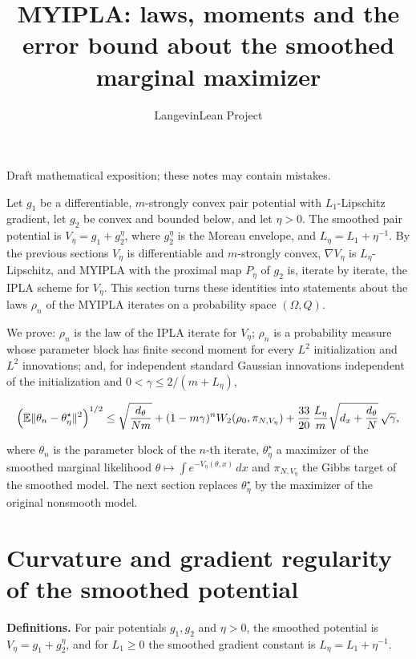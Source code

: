\documentclass[11pt,a4paper]{article}
\title{\texorpdfstring{MYIPLA: laws, moments and the error bound about the smoothed marginal maximizer}{MYIPLA: laws, moments and the error bound about the smoothed marginal maximizer}}
\author{LangevinLean Project}
\date{}
\begin{document}
\maketitle
Draft mathematical exposition; these notes may contain mistakes.


Let \(g_1\) be a differentiable, \(m\)-strongly convex pair potential with \(L_1\)-Lipschitz gradient, let \(g_2\) be convex and bounded below, and let \(\eta>0\). The smoothed pair potential is \(V_\eta=g_1+g_2^\eta\), where \(g_2^\eta\) is the Moreau envelope, and \(L_\eta=L_1+\eta^{-1}\). By the previous sections \(V_\eta\) is differentiable and \(m\)-strongly convex, \(\nabla V_\eta\) is \(L_\eta\)-Lipschitz, and MYIPLA with the proximal map \(P_\eta\) of \(g_2\) is, iterate by iterate, the IPLA scheme for \(V_\eta\). This section turns these identities into statements about the laws \(\rho_n\) of the MYIPLA iterates on a probability space \((\Omega,Q)\).




We prove: \(\rho_n\) is the law of the IPLA iterate for \(V_\eta\); \(\rho_n\) is a probability measure whose parameter block has finite second moment for every \(L^2\) initialization and \(L^2\) innovations; and, for independent standard Gaussian innovations independent of the initialization and \(0<\gamma\le2/(m+L_\eta)\),


\[\Bigl(\mathbb E\|\theta_n-\theta^\star_\eta\|^2\Bigr)^{1/2}\le\sqrt{\frac{d_\theta}{Nm}}+(1-m\gamma)^nW_2(\rho_0,\pi_{N,V_\eta})+\frac{33}{20}\,\frac{L_\eta}{m}\sqrt{d_x+\frac{d_\theta}N}\,\sqrt\gamma,\]


where \(\theta_n\) is the parameter block of the \(n\)-th iterate, \(\theta^\star_\eta\) a maximizer of the smoothed marginal likelihood \(\theta\mapsto\int e^{-V_\eta(\theta,x)}\,dx\) and \(\pi_{N,V_\eta}\) the Gibbs target of the smoothed model. The next section replaces \(\theta^\star_\eta\) by the maximizer of the original nonsmooth model.


\section{\texorpdfstring{Curvature and gradient regularity of the smoothed potential}{Curvature and gradient regularity of the smoothed potential}}


\textbf{Definitions.} For pair potentials \(g_1,g_2\) and \(\eta>0\), the smoothed potential is \(V_\eta=g_1+g_2^\eta\), and for \(L_1\ge0\) the smoothed gradient constant is \(L_\eta=L_1+\eta^{-1}\).
\end{document}
